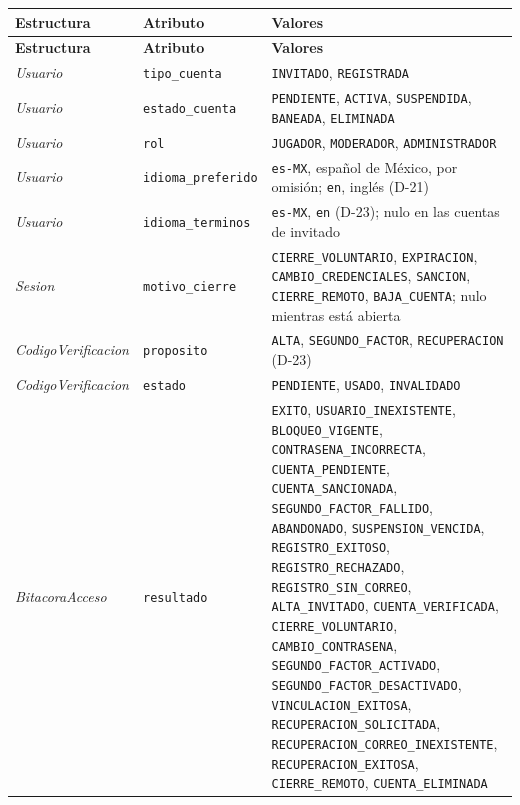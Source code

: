 \begin{center}\small
\begin{longtable}{|L{0.20\textwidth}|L{0.16\textwidth}|L{0.54\textwidth}|}
\hline
\textbf{Estructura} & \textbf{Atributo} & \textbf{Valores} \\ \hline
\endfirsthead
\hline
\textbf{Estructura} & \textbf{Atributo} & \textbf{Valores} \\ \hline
\endhead
\textit{Usuario} & \texttt{tipo\_\allowbreak{}cuenta} & \texttt{INVITADO}, \texttt{REGISTRADA} \\ \hline
\textit{Usuario} & \texttt{estado\_\allowbreak{}cuenta} & \texttt{PENDIENTE}, \texttt{ACTIVA}, \texttt{SUSPENDIDA}, \texttt{BANEADA}, \texttt{ELIMINADA}\textdagger{} \\ \hline
\textit{Usuario} & \texttt{rol} & \texttt{JUGADOR}, \texttt{MODERADOR}\textdagger{}, \texttt{ADMINISTRADOR}\textdagger{} \\ \hline
\textit{Usuario} & \texttt{idioma\_\allowbreak{}preferido} & \texttt{es-MX}, español de México, por omisión; \texttt{en}, inglés (\mbox{D-21}) \\ \hline
\textit{Usuario} & \texttt{idioma\_\allowbreak{}terminos} & \texttt{es-MX}, \texttt{en} (\mbox{D-23}); nulo en las cuentas de invitado \\ \hline
\textit{Sesion} & \texttt{motivo\_\allowbreak{}cierre} & \texttt{CIERRE\_\allowbreak{}VOLUNTARIO}, \texttt{EXPIRACION}, \texttt{CAMBIO\_\allowbreak{}CREDENCIALES}, \texttt{SANCION}, \texttt{CIERRE\_\allowbreak{}REMOTO}\textdagger{}, \texttt{BAJA\_\allowbreak{}CUENTA}\textdagger{}; nulo mientras está abierta \\ \hline
\textit{Codigo\-Verificacion} & \texttt{proposito} & \texttt{ALTA}, \texttt{SEGUNDO\_\allowbreak{}FACTOR}, \texttt{RECUPERACION}\textdagger{} (\mbox{D-23}) \\ \hline
\textit{Codigo\-Verificacion} & \texttt{estado} & \texttt{PENDIENTE}, \texttt{USADO}, \texttt{INVALIDADO} \\ \hline
\textit{BitacoraAcceso} & \texttt{resultado} & \texttt{EXITO}, \texttt{USUARIO\_\allowbreak{}INEXISTENTE}, \texttt{BLOQUEO\_\allowbreak{}VIGENTE}, \texttt{CONTRASENA\_\allowbreak{}INCORRECTA}, \texttt{CUENTA\_\allowbreak{}PENDIENTE}, \texttt{CUENTA\_\allowbreak{}SANCIONADA}, \texttt{SEGUNDO\_\allowbreak{}FACTOR\_\allowbreak{}FALLIDO}, \texttt{ABANDONADO}, \texttt{SUSPENSION\_\allowbreak{}VENCIDA}, \texttt{REGISTRO\_\allowbreak{}EXITOSO}, \texttt{REGISTRO\_\allowbreak{}RECHAZADO}, \texttt{REGISTRO\_\allowbreak{}SIN\_\allowbreak{}CORREO}, \texttt{ALTA\_\allowbreak{}INVITADO}, \texttt{CUENTA\_\allowbreak{}VERIFICADA}, \texttt{CIERRE\_\allowbreak{}VOLUNTARIO}, \texttt{CAMBIO\_\allowbreak{}CONTRASENA}, \texttt{SEGUNDO\_\allowbreak{}FACTOR\_\allowbreak{}ACTIVADO}, \texttt{SEGUNDO\_\allowbreak{}FACTOR\_\allowbreak{}DESACTIVADO}, \texttt{VINCULACION\_\allowbreak{}EXITOSA}\textdagger{}, \texttt{RECUPERACION\_\allowbreak{}SOLICITADA}\textdagger{}, \texttt{RECUPERACION\_\allowbreak{}CORREO\_\allowbreak{}INEXISTENTE}\textdagger{}, \texttt{RECUPERACION\_\allowbreak{}EXITOSA}\textdagger{}, \texttt{CIERRE\_\allowbreak{}REMOTO}\textdagger{}, \texttt{CUENTA\_\allowbreak{}ELIMINADA}\textdagger{} \\ \hline

\end{longtable}
\end{center}

